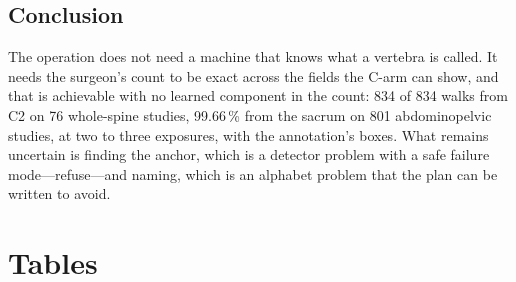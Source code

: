 \documentclass[11pt,letterpaper]{article}
\begin{document}
\subsection*{Conclusion}
The operation does not need a machine that knows what a vertebra is called. It needs the surgeon's count to
be exact across the fields the C-arm can show, and that is achievable with no learned component in the
count: 834 of 834 walks from C2 on 76 whole-spine studies, 99.66\,\% from the sacrum on 801 abdominopelvic
studies, at two to three exposures, with the annotation's boxes. What remains uncertain is finding the
anchor, which is a detector problem with a safe failure mode---refuse---and naming, which is an alphabet
problem that the plan can be written to avoid.

\clearpage
\section*{Tables}

\begin{table}[htbp]\centering
\caption{Counting arms, with the annotation's vertebra boxes. \emph{Reached} is the number of walks in
which the target entered a field before the image ran out; \emph{exact} is scored on those.
\emph{Anchor held} is a diagnostic, never a gate.}
\label{tab:count}
\small
{}
\end{table}
\end{document}
